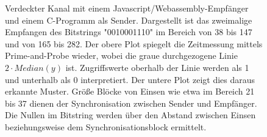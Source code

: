 \captionsetup[figure]{skip=-15pt}
\label{fig:covert_channel}
\begin{figure}[h]
\centering
\begin{scaletikzpicturetowidth}{\textwidth}

\end{scaletikzpicturetowidth}
\caption{Verdeckter Kanal mit einem Javascript/Webassembly-Empfänger und einem C-Programm als Sender. Dargestellt ist das zweimalige Empfangen des Bitstrings "0010001110" im Bereich von 38 bis 147 und von 165 bis 282. Der obere Plot spiegelt die Zeitmessung mittels Prime-and-Probe wieder, wobei die graue durchgezogene Linie $2 \cdot Median(y)$ ist. Zugriffswerte oberhalb der Linie werden als 1 und unterhalb als 0 interpretiert. Der untere Plot zeigt dies daraus erkannte Muster. Größe Blöcke von Einsen wie etwa im Bereich 21 bis 37 dienen der Synchronisation zwischen Sender und Empfänger. Die Nullen im Bitstring werden über den Abstand zwischen Einsen beziehungsweise dem Synchronisationsblock ermittelt.}
\end{figure}
\captionsetup[figure]{skip=10pt}







